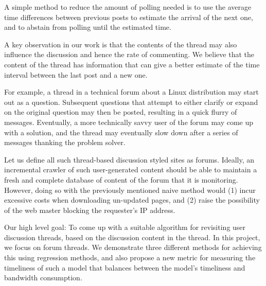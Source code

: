 A simple method to reduce the amount of polling needed is to use the
average time differences between previous posts to estimate the
arrival of the next one, and to abstain from polling until the
estimated time.

A key observation in our work is that the contents of the thread may
also influence the discussion and hence the rate of commenting.  We
believe that the content of the thread has information that can give a
better estimate of the time interval between the last post and a new
one.

For example, a thread in a technical forum about a Linux distribution may start 
out as a question. Subsequent questions that attempt to either clarify or expand 
on the original question may then be posted, resulting in a quick flurry of 
messages. Eventually, a more technically savvy user of the forum may come up 
with a solution, and the thread may eventually slow down after a series of 
messages thanking the problem solver. 

Let us define all such thread-based discussion styled sites as forums. Ideally, 
an incremental crawler of such user-generated content should be able to maintain 
a fresh and complete database of content of the forum that it is monitoring.  
However, doing so with the previously mentioned naive method would (1) incur 
excessive costs when downloading un-updated pages, and (2) raise the possibility 
of the web master blocking the requester's IP address.

Our high level goal: To come up with a suitable algorithm for revisiting user 
discussion threads, based on the discussion content in the thread. In this 
project, we focus on forum threads. We demonstrate three different methods for 
achieving this using regression methods, and also propose a new metric for 
measuring the timeliness of such a model that balances between the model's 
timeliness and bandwidth consumption.


